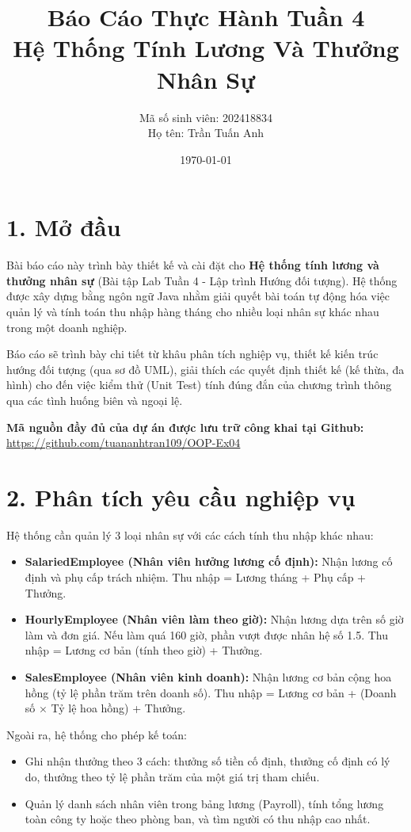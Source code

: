 \documentclass[12pt,a4paper]{article}
\title{\textbf{Báo Cáo Thực Hành Tuần 4\\ Hệ Thống Tính Lương Và Thưởng Nhân Sự}}
\author{Mã số sinh viên: 202418834 \\ Họ tên: Trần Tuấn Anh}
\date{\today}
\begin{document}
\maketitle

\section{1. Mở đầu}
Bài báo cáo này trình bày thiết kế và cài đặt cho \textbf{Hệ thống tính lương và thưởng nhân sự} (Bài tập Lab Tuần 4 - Lập trình Hướng đối tượng). Hệ thống được xây dựng bằng ngôn ngữ Java nhằm giải quyết bài toán tự động hóa việc quản lý và tính toán thu nhập hàng tháng cho nhiều loại nhân sự khác nhau trong một doanh nghiệp. 

Báo cáo sẽ trình bày chi tiết từ khâu phân tích nghiệp vụ, thiết kế kiến trúc hướng đối tượng (qua sơ đồ UML), giải thích các quyết định thiết kế (kế thừa, đa hình) cho đến việc kiểm thử (Unit Test) tính đúng đắn của chương trình thông qua các tình huống biên và ngoại lệ.

\textbf{Mã nguồn đầy đủ của dự án được lưu trữ công khai tại Github:} \\
\url{https://github.com/tuananhtran109/OOP-Ex04}

\section{2. Phân tích yêu cầu nghiệp vụ}
Hệ thống cần quản lý 3 loại nhân sự với các cách tính thu nhập khác nhau:
\begin{itemize}
    \item \textbf{SalariedEmployee (Nhân viên hưởng lương cố định):} Nhận lương cố định và phụ cấp trách nhiệm. Thu nhập = Lương tháng + Phụ cấp + Thưởng.
    \item \textbf{HourlyEmployee (Nhân viên làm theo giờ):} Nhận lương dựa trên số giờ làm và đơn giá. Nếu làm quá 160 giờ, phần vượt được nhân hệ số 1.5. Thu nhập = Lương cơ bản (tính theo giờ) + Thưởng.
    \item \textbf{SalesEmployee (Nhân viên kinh doanh):} Nhận lương cơ bản cộng hoa hồng (tỷ lệ phần trăm trên doanh số). Thu nhập = Lương cơ bản + (Doanh số $\times$ Tỷ lệ hoa hồng) + Thưởng.
\end{itemize}

Ngoài ra, hệ thống cho phép kế toán:
\begin{itemize}
    \item Ghi nhận thưởng theo 3 cách: thưởng số tiền cố định, thưởng cố định có lý do, thưởng theo tỷ lệ phần trăm của một giá trị tham chiếu.
    \item Quản lý danh sách nhân viên trong bảng lương (Payroll), tính tổng lương toàn công ty hoặc theo phòng ban, và tìm người có thu nhập cao nhất.
\end{itemize}
\end{document}
